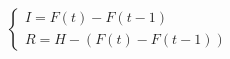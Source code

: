 \begin{equation}
\left\{ \begin{array}{l}
   I = F(t) - F(t-1)\\
   R = H - \left(F(t) - F(t-1) \right)
  \end{array}
\right.
\end{equation}